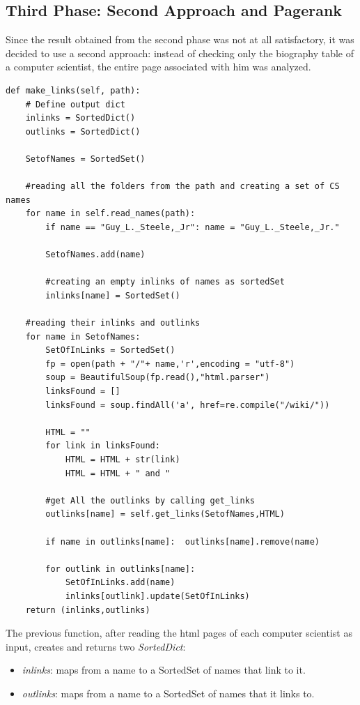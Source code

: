\documentclass[12pt, twoside]{article}
\begin{document}
\subsection{Third Phase: Second Approach and Pagerank}
Since the result obtained from the second phase was not at all satisfactory, it was decided to use a second approach: instead of checking only the biography table of a computer scientist, the entire page associated with him was analyzed.
\vspace{6pt}
\begin{lstlisting}[language = iPython, caption={Making Links},captionpos=b]
def make_links(self, path):
	# Define output dict
	inlinks = SortedDict() 
	outlinks = SortedDict()

	SetofNames = SortedSet()

	#reading all the folders from the path and creating a set of CS names
	for name in self.read_names(path):
		if name == "Guy_L._Steele,_Jr":	name = "Guy_L._Steele,_Jr."

		SetofNames.add(name)

		#creating an empty inlinks of names as sortedSet
		inlinks[name] = SortedSet()

	#reading their inlinks and outlinks
	for name in SetofNames:
		SetOfInLinks = SortedSet()
		fp = open(path + "/"+ name,'r',encoding = "utf-8")
		soup = BeautifulSoup(fp.read(),"html.parser")
		linksFound = []
		linksFound = soup.findAll('a', href=re.compile("/wiki/"))

		HTML = ""
		for link in linksFound:
			HTML = HTML + str(link)
			HTML = HTML + " and "

		#get All the outlinks by calling get_links
		outlinks[name] = self.get_links(SetofNames,HTML)

		if name in outlinks[name]:	outlinks[name].remove(name)

		for outlink in outlinks[name]:
			SetOfInLinks.add(name)
			inlinks[outlink].update(SetOfInLinks)
	return (inlinks,outlinks)
\end{lstlisting}
The previous function, after reading the html pages of each computer scientist as input, creates and returns two \textit{SortedDict}:
\begin{itemize}[noitemsep, topsep=0pt]
	\item \textit{inlinks}: maps from a name to a SortedSet of names that link to it.
	\item \textit{outlinks}: maps from a name to a SortedSet of names that it links to.
\end{itemize}
\end{document}
